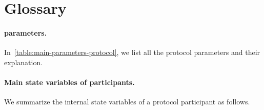 \section{Glossary}
\label{sec:glossray}

\paragraph{\pSMR parameters.}
%
In~\cref{table:main-parameters-protocol}, we list all the protocol parameters and their explanation.



\paragraph{Main state variables of \pSMR participants.}
%
We summarize the internal state variables of a protocol participant as follows.


